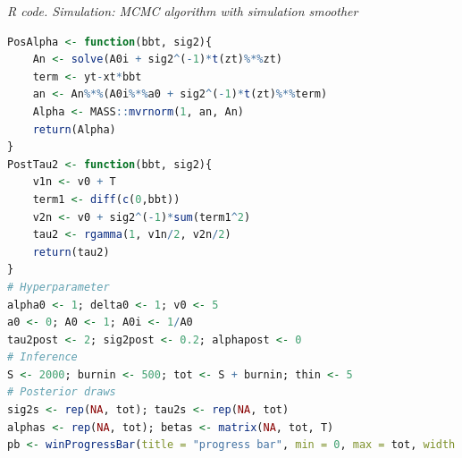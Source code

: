 \begin{enumerate}[leftmargin=*]
\begin{tcolorbox}[enhanced,width=4.67in,center upper,
	fontupper=\large\bfseries,drop shadow southwest,sharp corners]
	\textit{R code. Simulation: MCMC algorithm with simulation smoother}
	\begin{VF}
		\begin{lstlisting}[language=R]
PosAlpha <- function(bbt, sig2){
	An <- solve(A0i + sig2^(-1)*t(zt)%*%zt)
	term <- yt-xt*bbt
	an <- An%*%(A0i%*%a0 + sig2^(-1)*t(zt)%*%term)
	Alpha <- MASS::mvrnorm(1, an, An)
	return(Alpha)
}
PostTau2 <- function(bbt, sig2){
	v1n <- v0 + T
	term1 <- diff(c(0,bbt))
	v2n <- v0 + sig2^(-1)*sum(term1^2)
	tau2 <- rgamma(1, v1n/2, v2n/2)
	return(tau2)
}
# Hyperparameter
alpha0 <- 1; delta0 <- 1; v0 <- 5
a0 <- 0; A0 <- 1; A0i <- 1/A0
tau2post <- 2; sig2post <- 0.2; alphapost <- 0
# Inference
S <- 2000; burnin <- 500; tot <- S + burnin; thin <- 5
# Posterior draws
sig2s <- rep(NA, tot); tau2s <- rep(NA, tot)
alphas <- rep(NA, tot); betas <- matrix(NA, tot, T)
pb <- winProgressBar(title = "progress bar", min = 0, max = tot, width = 300)
\end{lstlisting}
	\end{VF}
\end{tcolorbox} 


\end{enumerate}
